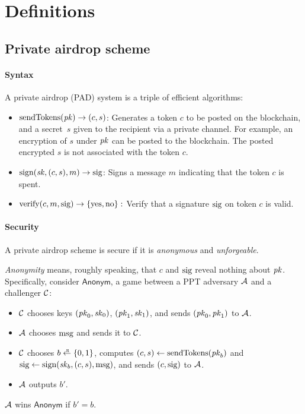 \section{Definitions}\label{sec:defs}

\subsection{Private airdrop scheme}

\paragraph{Syntax} A private airdrop (PAD) system is a triple of efficient algorithms:
\begin{itemize}
\item $\text{sendTokens}(\mathit{pk}) \to (c, s)$:
Generates a token $c$ to be posted on the blockchain,
and a secret~$s$ given to the recipient via a private channel.
For example, an encryption of $s$ under $\mathit{pk}$ can be posted
to the blockchain.   The posted encrypted $s$ is not associated with 
the token $c$. 

\item $\text{sign}(\mathit{sk}, (c, s), m) \to \text{sig}$:
Signs a message $m$ indicating that the token $c$ is spent.

\item $\text{verify}(c, m, \text{sig}) \to \{\text{yes},\text{no}\}:$
Verify that a signature $\text{sig}$ on token $c$ is valid.
\end{itemize}

\paragraph{Security} A private airdrop scheme is secure if it is \emph{anonymous} and \emph{unforgeable}.

\medskip\noindent\textit{Anonymity} means, roughly speaking, that $c$ and $\text{sig}$ reveal
    nothing about $\mathit{pk}$.
Specifically, consider $\mathsf{Anonym}$, a game between a PPT adversary $\mathcal{A}$
    and a challenger $\mathcal{C}$:
%
\begin{itemize}
\item $\mathcal{C}$ chooses keys $(\mathit{pk}_0, \mathit{sk}_0)$, $(\mathit{pk}_1, \mathit{sk}_1)$, and sends $(\mathit{pk}_0, \mathit{pk}_1)$ to $\mathcal{A}$.

\item $\mathcal{A}$ chooses $\text{msg}$ and sends it to $\mathcal{C}$.

\item $\mathcal{C}$ chooses $b \rgets \{0,1\}$,
computes $(c, s) \gets \text{sendTokens}(\mathit{pk}_b)$ and
$\text{sig} \gets \text{sign}(\mathit{sk}_b, (c, s), \text{msg})$,
and sends $(c, \text{sig})$ to $\mathcal{A}$.

\item $\mathcal{A}$ outputs $b'$.

\end{itemize}
%
$\mathcal{A}$ wins $\mathsf{Anonym}$ if $b' = b$.

